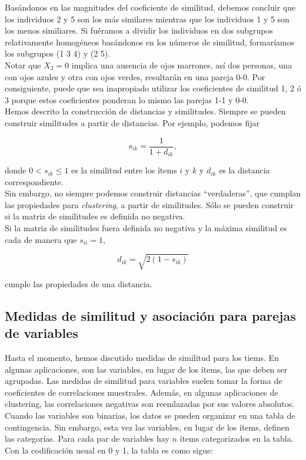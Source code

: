 \documentclass[a4paper, 20pt]{article}
\begin{document}
Basándonos en las magnitudes del coeficiente de similitud, debemos concluir que los individuos 2 y 5 son los más similares mientras que los individuos 1 y 5 son los menos similiares. Si fuéramos a dividir los individuos en dos subgrupos relativamente homogéneos basándonos en los números de similitud, formaríamos los subgrupos (1 3 4) y (2 5).\\
Notar que $X_3=0$ implica una ausencia de ojos marrones, así dos personas, una con ojos azules y otra con ojos verdes, resultarán en una pareja 0-0. Por consiguiente, puede que sea inapropiado utilizar los coeficientes de similitud 1, 2 ó 3 porque estos coeficientes ponderan lo mismo las parejas 1-1 y 0-0.\\

Hemos descrito la construcción de distancias y similitudes. Siempre se pueden construir similitudes a partir de distancias. Por ejemplo, podemos fijar

$$ s_{ik} = \frac{1}{1+d_{ik}},$$ 

donde $0<s_{ik}\leq 1$ es la similitud entre los ítems $i$ y $k$ y $d_{ik}$ es la distancia correspondiente.\\
Sin embargo, no siempre podemos construir distancias ``verdaderas'', que cumplan las propiedades para \textit{clustering}, a partir de similitudes. Sólo se pueden construir si la matriz de similitudes es definida no negativa.\\
Si la matriz de similitudes fuera definida no negativa y la máxima similitud es cada de manera que $s_{ii}=1$,

$$ d_{ik}=\sqrt{2(1-s_{ik})}$$

cumple las propiedades de una distancia.

\subsection{Medidas de similitud y asociación para parejas de variables}

Hasta el momento, hemos discutido medidas de similitud para los tiems. En algunas aplicaciones, son las variables, en lugar de los ítems, las que deben ser agrupadas. Las medidas de similitud para variables suelen tomar la forma de coeficientes de correlaciones muestrales. Además, en algunas aplicaciones de clustering, las correlaciones negativas son reemlazadas por sus valores absolutos.\\
Cuando las variables son binarias, los datos se pueden organizar en una tabla de contingencia. Sin embargo, esta vez las variables, en lugar de los ítems, definen las categorías. Para cada par de variables hay $n$ ítems categorizados en la tabla. Con la codificación usual en 0 y 1, la tabla es como sigue: 
\end{document}

